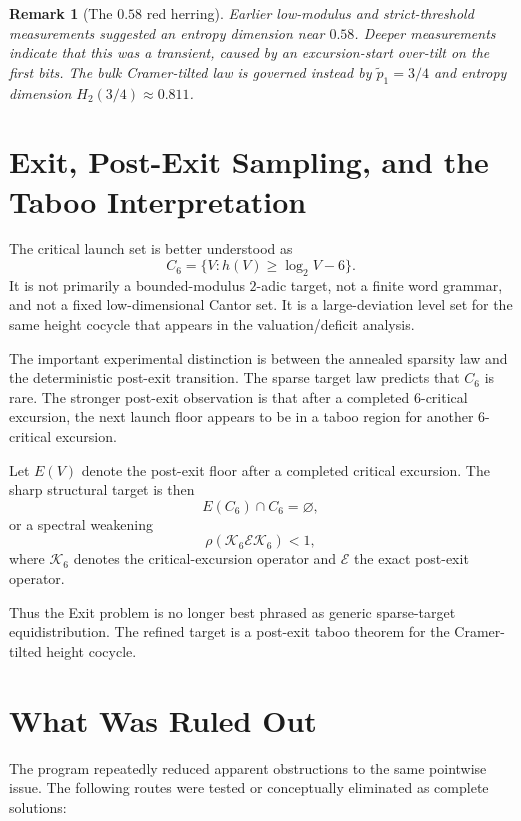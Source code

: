 \documentclass[11pt]{article}
\newtheorem{remark}{Remark}
\begin{document}
\begin{remark}[The $0.58$ red herring]
Earlier low-modulus and strict-threshold measurements suggested an entropy dimension near $0.58$.  Deeper measurements indicate that this was a transient, caused by an excursion-start over-tilt on the first bits.  The bulk Cramer-tilted law is governed instead by $\widetilde p_1=3/4$ and entropy dimension $H_2(3/4)\approx0.811$.
\end{remark}

\section{Exit, Post-Exit Sampling, and the Taboo Interpretation}

The critical launch set is better understood as
\[
C_6=\{V:h(V)\ge \log_2 V-6\}.
\]
It is not primarily a bounded-modulus $2$-adic target, not a finite word grammar, and not a fixed low-dimensional Cantor set.  It is a large-deviation level set for the same height cocycle that appears in the valuation/deficit analysis.

The important experimental distinction is between the annealed sparsity law and the deterministic post-exit transition.  The sparse target law predicts that $C_6$ is rare.  The stronger post-exit observation is that after a completed $6$-critical excursion, the next launch floor appears to be in a taboo region for another $6$-critical excursion.

Let $E(V)$ denote the post-exit floor after a completed critical excursion.  The sharp structural target is then
\[
E(C_6)\cap C_6=\varnothing,
\]
or a spectral weakening
\[
\rho(\mathcal K_6\mathcal E\mathcal K_6)<1,
\]
where $\mathcal K_6$ denotes the critical-excursion operator and $\mathcal E$ the exact post-exit operator.

Thus the Exit problem is no longer best phrased as generic sparse-target equidistribution.  The refined target is a post-exit taboo theorem for the Cramer-tilted height cocycle.

\section{What Was Ruled Out}

The program repeatedly reduced apparent obstructions to the same pointwise issue.  The following routes were tested or conceptually eliminated as complete solutions:
\end{document}

